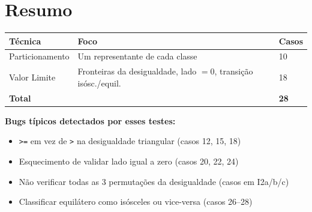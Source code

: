 \documentclass[12pt,a4paper]{article}
\begin{document}
\section{Resumo}

\begin{center}
\begin{tabular}{lll}
\toprule
\textbf{Técnica} & \textbf{Foco} & \textbf{Casos} \\
\midrule
Particionamento & Um representante de cada classe & 10 \\
Valor Limite & Fronteiras da desigualdade, lado $= 0$, transição isósc./equil. & 18 \\
\midrule
\textbf{Total} & & \textbf{28} \\
\bottomrule
\end{tabular}
\end{center}

\noindent\textbf{Bugs típicos detectados por esses testes:}
\begin{itemize}[nosep]
  \item \texttt{>=} em vez de \texttt{>} na desigualdade triangular (casos 12, 15, 18)
  \item Esquecimento de validar lado igual a zero (casos 20, 22, 24)
  \item Não verificar todas as 3 permutações da desigualdade (casos em I2a/b/c)
  \item Classificar equilátero como isósceles ou vice-versa (casos 26--28)
\end{itemize}
\end{document}
